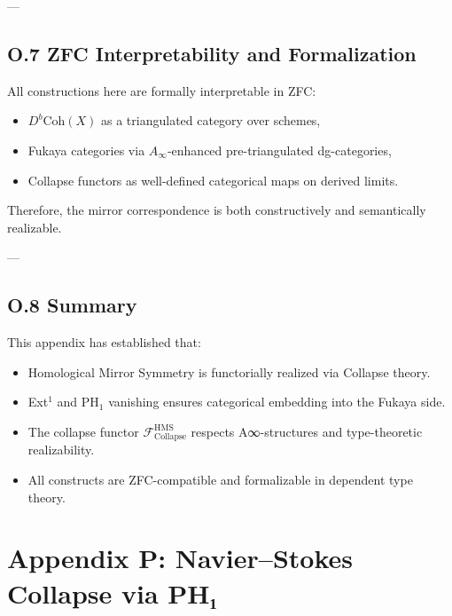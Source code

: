 \documentclass[11pt]{article}
\begin{document}
---

\subsection*{O.7 ZFC Interpretability and Formalization}

All constructions here are formally interpretable in ZFC:

\begin{itemize}
  \item $D^b\mathrm{Coh}(X)$ as a triangulated category over schemes,
  \item Fukaya categories via $A_\infty$-enhanced pre-triangulated dg-categories,
  \item Collapse functors as well-defined categorical maps on derived limits.
\end{itemize}

Therefore, the mirror correspondence is both constructively and semantically realizable.

---

\subsection*{O.8 Summary}

This appendix has established that:

\begin{itemize}
  \item Homological Mirror Symmetry is functorially realized via Collapse theory.
  \item Ext$^1$ and PH$_1$ vanishing ensures categorical embedding into the Fukaya side.
  \item The collapse functor $\mathcal{F}_{\mathrm{Collapse}}^{\mathrm{HMS}}$ respects A∞-structures and type-theoretic realizability.
  \item All constructs are ZFC-compatible and formalizable in dependent type theory.
\end{itemize}




\section*{Appendix P: Navier–Stokes Collapse via PH₁}
\end{document}
